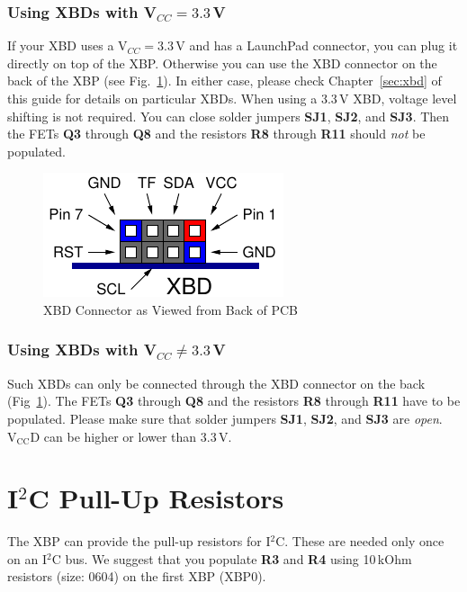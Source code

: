 \documentclass[twoside,11pt]{cergdoc}
\begin{document}
\subsubsection{Using XBDs with V$_{CC} = 3.3$\,V}
If your XBD uses a V$_{CC} = 3.3$\,V and has a LaunchPad connector, you can plug it 
directly on top of the XBP. 
Otherwise you can use the XBD connector on the back of the XBP (see Fig.~\ref{fig:xbd}).
In either case, please check Chapter~\ref{sec:xbd} of this guide for details
on particular XBDs. 
When using a 3.3\,V XBD, voltage level shifting is not required. 
You can close solder jumpers \textbf{SJ1}, \textbf{SJ2}, and \textbf{SJ3}. Then
the FETs \textbf{Q3} through \textbf{Q8} and the resistors \textbf{R8} through \textbf{R11} 
should \emph{not} be populated. 

\begin{figure}[ht]
  \begin{center}
    \includegraphics[scale=1]{figures/xbd_connector}
    \caption{XBD Connector as Viewed from Back of PCB}\label{fig:xbd}
  \end{center}
\vspace{-1ex}
\end{figure}

\subsubsection{Using XBDs with V$_{CC} \not= 3.3$\,V}
Such XBDs can only be connected through the XBD connector on the back (Fig~\ref{fig:xbd}).
The FETs \textbf{Q3} through \textbf{Q8} and the resistors \textbf{R8}  through \textbf{R11}
 have to be populated.
Please make sure that solder jumpers \textbf{SJ1}, \textbf{SJ2}, and \textbf{SJ3} 
are \emph{open}. $\mathrm{V_{CC}D}$ can be higher or lower than 3.3\,V.

\section{I$^2$C Pull-Up Resistors}\label{sec:i2cr}
The XBP can provide the pull-up resistors for I$^2$C. These are needed only once on an 
I$^2$C bus. We suggest that you populate \textbf{R3} and \textbf{R4} using 
10\,kOhm resistors (size: 0604) on the first XBP (XBP0).
\end{document}
